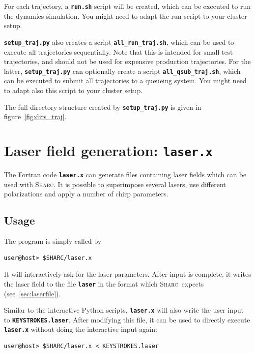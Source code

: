\documentclass[a4paper,10pt,DIV=15,openany]{scrbook}
\newcommand{\sharc}{\textsc{Sharc}}
\newcommand{\ttt}[1]{\textbf{\texttt{#1}}}
\begin{document}
For each trajectory, a \ttt{run.sh} script will be created, which can be executed to run the dynamics simulation. You might need to adapt the run script to your cluster setup.

\ttt{setup\_traj.py} also creates a script \ttt{all\_run\_traj.sh}, which can be used to execute all trajectories sequentially.
Note that this is intended for small test trajectories, and should not be used for expensive production trajectories.
For the latter, \ttt{setup\_traj.py} can optionally create a script \ttt{all\_qsub\_traj.sh}, which can be executed to submit all trajectories to a queueing system. You might need to adapt also this script to your cluster setup.

The full directory structure created by \ttt{setup\_traj.py} is given in figure~\ref{fig:dirs_traj}.








\section{Laser field generation: \ttt{laser.x}}\label{sec:laser.x}

The Fortran code \ttt{laser.x} can generate files containing laser fields which can be used with \sharc. It is possible to superimpose several lasers, use different polarizations and apply a number of chirp parameters.

\subsection{Usage}

The program is simply called by 
\begin{verbatim}
user@host> $SHARC/laser.x
\end{verbatim}
It will interactively ask for the laser parameters. After input is complete, it writes the laser field to the file \ttt{laser} in the format which \sharc\ expects (see~\ref{sec:laserfile}).

Similar to the interactive Python scripts, \ttt{laser.x} will also write the user input to \ttt{KEYSTROKES.laser}. After modifying this file, it can be used to directly execute \ttt{laser.x} without doing the interactive input again:
\begin{verbatim}
user@host> $SHARC/laser.x < KEYSTROKES.laser
\end{verbatim}
\end{document}

